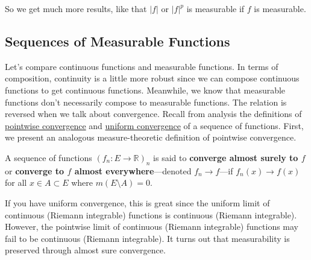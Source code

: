   So we get much more results, like that $|f|$ or $|f|^p$ is measurable if $f$ is measurable. 

\subsection{Sequences of Measurable Functions}

  Let's compare continuous functions and measurable functions. In terms of composition, continuity is a little more robust since we can compose continuous functions to get continuous functions. Meanwhile, we know that measurable functions don't necessarily compose to measurable functions. The relation is reversed when we talk about convergence. Recall from analysis the definitions of \hyperref[real-def:pointwise-convergence]{pointwise convergence} and \hyperref[real-def:uniform-convergence]{uniform convergence} of a sequence of functions. First, we present an analogous measure-theoretic definition of pointwise convergence. 

  \begin{definition}
    A sequence of functions $(f_n: E \to \mathbb{R})_n$ is said to \textbf{converge almost surely to $f$} or \textbf{converge to $f$ almost everywhere}---denoted $f_n \to f$---if $f_n (x) \to f(x)$ for all $x \in A \subset E$ where $m(E \setminus A) = 0$. 
  \end{definition}

  If you have uniform convergence, this is great since the uniform limit of continuous (Riemann integrable) functions is continuous (Riemann integrable). However, the pointwise limit of continuous (Riemann integrable) functions may fail to be continuous (Riemann integrable). It turns out that measurability is preserved through almost sure convergence. 

